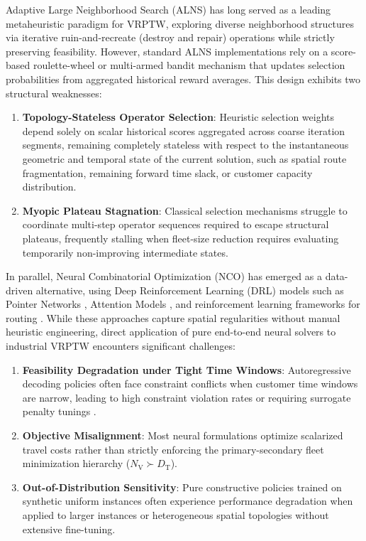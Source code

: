\documentclass{ieeeaccess}
\newcommand{\NV}{{N_\mathrm{V}}}
\newcommand{\TD}{{D_\mathrm{T}}}
\begin{document}
Adaptive Large Neighborhood Search (ALNS) \cite{Ropke2006, pisinger2007general} has long served as a leading metaheuristic paradigm for VRPTW, exploring diverse neighborhood structures via iterative ruin-and-recreate (destroy and repair) operations while strictly preserving feasibility. However, standard ALNS implementations rely on a score-based roulette-wheel or multi-armed bandit mechanism that updates selection probabilities from aggregated historical reward averages. This design exhibits two structural weaknesses:
\begin{enumerate}
    \item \textbf{Topology-Stateless Operator Selection}: Heuristic selection weights depend solely on scalar historical scores aggregated across coarse iteration segments, remaining completely stateless with respect to the instantaneous geometric and temporal state of the current solution, such as spatial route fragmentation, remaining forward time slack, or customer capacity distribution.
    \item \textbf{Myopic Plateau Stagnation}: Classical selection mechanisms struggle to coordinate multi-step operator sequences required to escape structural plateaus, frequently stalling when fleet-size reduction requires evaluating temporarily non-improving intermediate states.
\end{enumerate}

In parallel, Neural Combinatorial Optimization (NCO) has emerged as a data-driven alternative, using Deep Reinforcement Learning (DRL) models such as Pointer Networks \cite{vinyals2015pointer}, Attention Models \cite{kool2019attention}, and reinforcement learning frameworks for routing \cite{nazari2018reinforcement}. While these approaches capture spatial regularities without manual heuristic engineering, direct application of pure end-to-end neural solvers to industrial VRPTW encounters significant challenges:
\begin{enumerate}
    \item \textbf{Feasibility Degradation under Tight Time Windows}: Autoregressive decoding policies often face constraint conflicts when customer time windows are narrow, leading to high constraint violation rates or requiring surrogate penalty tunings \cite{falkner2020learning, lin2021deep}.
    \item \textbf{Objective Misalignment}: Most neural formulations optimize scalarized travel costs rather than strictly enforcing the primary-secondary fleet minimization hierarchy ($\NV \succ \TD$).
    \item \textbf{Out-of-Distribution Sensitivity}: Pure constructive policies trained on synthetic uniform instances often experience performance degradation when applied to larger instances or heterogeneous spatial topologies without extensive fine-tuning.
\end{enumerate}
\end{document}
